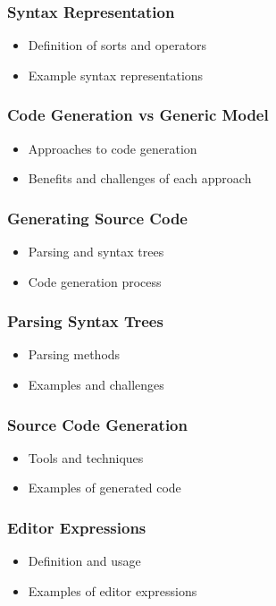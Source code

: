 \documentclass[t,24pt,aspectratio=169]{beamer}
\begin{document}
\begin{frame}[hvid]
    \frametitle{Syntax Representation}
    \begin{itemize}
        \item Definition of sorts and operators
        \item Example syntax representations
    \end{itemize}
\end{frame}

\begin{frame}[hvid]
    \frametitle{Code Generation vs Generic Model}
    \begin{itemize}
        \item Approaches to code generation
        \item Benefits and challenges of each approach
    \end{itemize}
\end{frame}

\begin{frame}[hvid]
    \frametitle{Generating Source Code}
    \begin{itemize}
        \item Parsing and syntax trees
        \item Code generation process
    \end{itemize}
\end{frame}

\begin{frame}[hvid]
    \frametitle{Parsing Syntax Trees}
    \begin{itemize}
        \item Parsing methods
        \item Examples and challenges
    \end{itemize}
\end{frame}

\begin{frame}[hvid]
    \frametitle{Source Code Generation}
    \begin{itemize}
        \item Tools and techniques
        \item Examples of generated code
    \end{itemize}
\end{frame}

\begin{frame}[hvid]
    \frametitle{Editor Expressions}
    \begin{itemize}
        \item Definition and usage
        \item Examples of editor expressions
    \end{itemize}
\end{frame}
\end{document}
